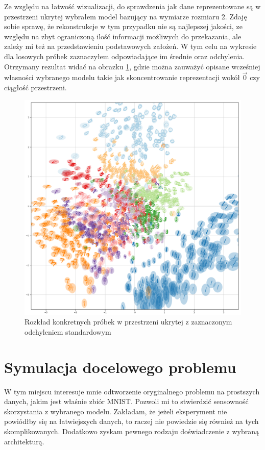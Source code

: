 Ze względu na łatwość wizualizacji, do sprawdzenia jak dane reprezentowane są w przestrzeni ukrytej wybrałem model bazujący na wymiarze rozmiaru 2. Zdaję sobie sprawę, że rekonstrukcje w tym przypadku nie są najlepszej jakości, ze względu na zbyt ograniczoną ilość informacji możliwych do przekazania, ale zależy mi też na przedstawieniu podstawowych założeń. W tym celu na wykresie dla losowych próbek zaznaczyłem odpowiadające im średnie oraz odchylenia. Otrzymany rezultat widać na obrazku \ref{fig:mnist_2d}, gdzie można zauważyć opisane wcześniej własności wybranego modelu takie jak skoncentrowanie reprezentacji wokół $\vec{0}$ czy ciągłość przestrzeni.

\begin{figure}[h!]
    \includegraphics[width=1.2\textwidth,center]{images/mnist_2d}
    \caption{Rozkład konkretnych próbek w przestrzeni ukrytej z zaznaczonym odchyleniem standardowym}
    \label{fig:mnist_2d}
\end{figure}

\section{Symulacja docelowego problemu}

W tym miejscu interesuje mnie odtworzenie oryginalnego problemu na prostszych danych, jakim jest właśnie zbiór MNIST. Pozwoli mi to stwierdzić sensowność skorzystania z wybranego modelu. Zakładam, że jeżeli eksperyment nie powiódłby się na łatwiejszych danych, to raczej nie powiedzie się również na tych skomplikowanych. Dodatkowo zyskam pewnego rodzaju doświadczenie z wybraną architekturą.

